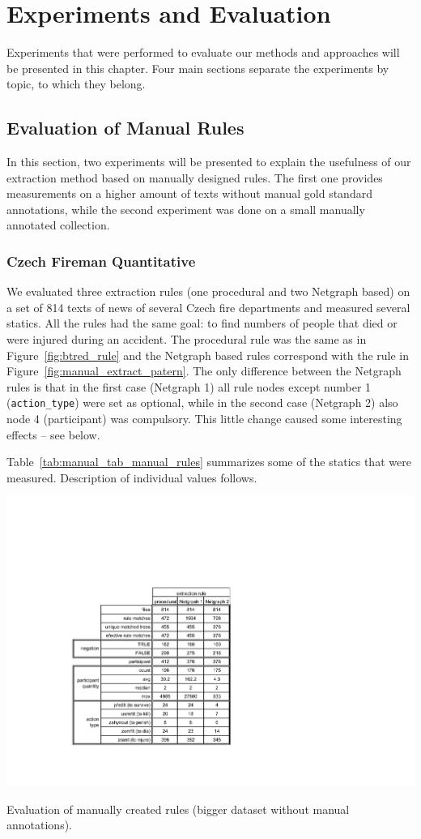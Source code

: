 \chapter{Experiments and Evaluation} \label{sec:ch_eval}

Experiments that were performed to evaluate our methods and approaches will be presented in this chapter. Four main sections separate the experiments by topic, to which they belong.

\section{Evaluation of Manual Rules} \graphicspath{{../img/ch50/}}


In this section, two experiments will be presented to explain the usefulness of our extraction method based on manually designed rules. 
The first one provides measurements on a higher amount of texts without manual gold standard annotations, while the second experiment was done on a small manually annotated collection. 

\subsection{Czech Fireman Quantitative} \label{sec:manual_quant_experiment}

We evaluated three extraction rules (one procedural and two Netgraph based) on a set of 814 texts of news of several Czech fire departments and measured several statics. All the rules had the same goal: to find numbers of people that died or were injured during an accident. The procedural rule was the same as in Figure~\ref{fig:btred_rule} and the Netgraph based rules correspond with the rule in Figure~\ref{fig:manual_extract_patern}. The only difference between the Netgraph rules is that in the first case (Netgraph 1) all rule nodes except number 1 (\verb+action_type+) were set as optional, while in the second case (Netgraph 2) also node 4 (participant) was compulsory. This little change caused some interesting effects -- see below. 

Table~\ref{tab:manual_tab_manual_rules} summarizes some of the statics that were measured. Description of individual values follows.

\begin{table}
	\centering
		\includegraphics[angle=-90,width=0.6\hsize]{tab_manual_rules}
	\caption{Evaluation of manually created rules (bigger dataset without manual annotations).}
	\label{tab:manual_tab_manual_rules}
\end{table}


